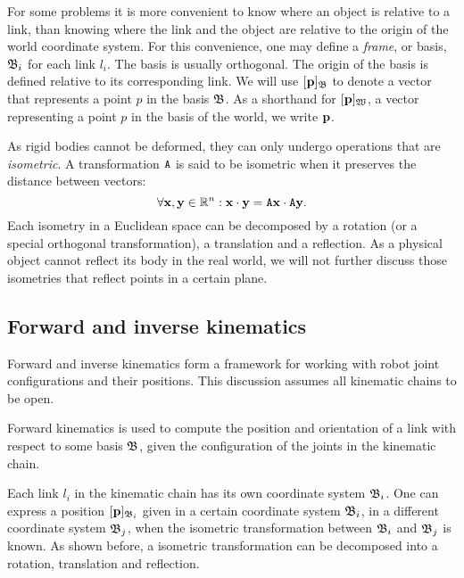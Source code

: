For some problems it is more convenient to know where an object is relative to a link, than knowing where the link and the object are relative to the origin of the world coordinate system.  For this convenience, one may define a \emph{frame}, or basis, $\mathfrak{B}_i$ for each link $l_i$.  The basis is usually orthogonal.  The origin of the basis is defined relative to its corresponding link.  We will use $[\mathbf{p}]_{\mathfrak{B}}$ to denote a vector that represents a point $p$ in the basis $\mathfrak{B}$.  As a shorthand for $[\mathbf{p}]_\mathfrak{W}$, a vector representing a point $p$ in the basis of the world, we write $\mathbf{p}$.

As rigid bodies cannot be deformed, they can only undergo operations that are \emph{isometric}.  A transformation $\mathtt{A}$ is said to be isometric when it preserves the distance between vectors: \[ \forall \mathbf{x}, \mathbf{y} \in \mathbb{R}^n: \mathbf{x} \cdot \mathbf{y} = \mathtt{A}\mathbf{x} \cdot \mathtt{A}\mathbf{y}.\]  Each isometry in a Euclidean space can be decomposed by a rotation (or a special orthogonal transformation), a translation and a reflection.  As a physical object cannot reflect its body in the real world, we will not further discuss those isometries that reflect points in a certain plane.







\subsection{Forward and inverse kinematics}
\label{theory/kinematics}

Forward and inverse kinematics form a framework for working with robot joint configurations and their positions.  This discussion assumes all kinematic chains to be open.

Forward kinematics is used to compute the position and orientation of a link with respect to some basis $\mathfrak{B}$, given the configuration of the joints in the kinematic chain.

Each link $l_i$ in the kinematic chain has its own coordinate system $\mathfrak{B}_i$. One can express a position  $[\mathbf{p}]_{\mathfrak{B}_i}$ given in a certain coordinate system $\mathfrak{B}_i$, in a different coordinate system $\mathfrak{B}_j$, when the isometric transformation between $\mathfrak{B}_i$ and $\mathfrak{B}_j$ is known.  As shown before, a isometric transformation can be decomposed into a rotation, translation and reflection.  
